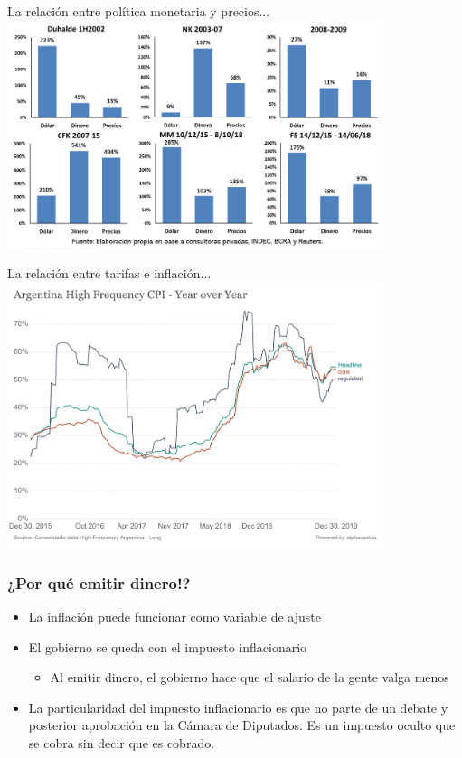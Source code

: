 \documentclass{beamer}
\begin{document}
\begin{frame}{La relación entre política monetaria y precios...}
\centering\includegraphics[width=11cm]{Slides Principios de Economia/Figures/P57.png}\
\end{frame}

\begin{frame}{La relación entre tarifas e inflación...}
\centering\includegraphics[width=11cm]{Slides Principios de Economia/Figures/G20.png}\
\end{frame}


\begin{frame}
\frametitle{¿Por qué emitir dinero!?}
\begin{itemize}
    \item La inflación puede funcionar como variable de ajuste \vspace{2mm}
    \item El gobierno se queda con el impuesto inflacionario
    \begin{itemize}
        \item Al emitir dinero, el gobierno hace que el salario de la gente valga menos
    \end{itemize}
    \item La particularidad del impuesto inflacionario es que no parte de un debate y posterior aprobación en la Cámara de Diputados. Es un impuesto oculto que se cobra sin decir que es cobrado.
\end{itemize}
\end{frame}
\end{document}
